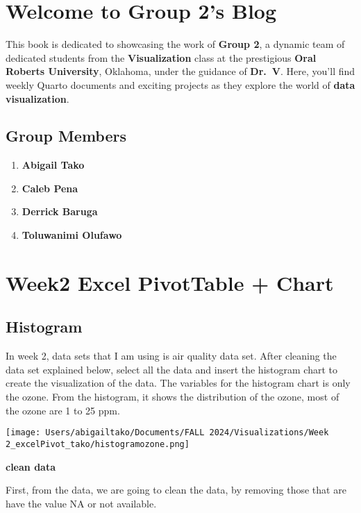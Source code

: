 \documentclass[
  letterpaper,
  DIV=11,
  numbers=noendperiod]{scrreprt}
\providecommand{\tightlist}{%
  \setlength{\itemsep}{0pt}\setlength{\parskip}{0pt}}\usepackage{longtable,booktabs,array}
\begin{document}
\chapter{Welcome to Group 2's Blog}\label{welcome-to-group-2s-blog}

This book is dedicated to showcasing the work of \textbf{Group 2}, a
dynamic team of dedicated students from the \textbf{Visualization} class
at the prestigious \textbf{Oral Roberts University}, Oklahoma, under the
guidance of \textbf{Dr.~V}. Here, you'll find weekly Quarto documents
and exciting projects as they explore the world of \textbf{data
visualization}.

\section{Group Members}\label{group-members}

\begin{enumerate}
\def\labelenumi{\arabic{enumi}.}
\tightlist
\item
  \textbf{Abigail Tako}
\item
  \textbf{Caleb Pena}
\item
  \textbf{Derrick Baruga}
\item
  \textbf{Toluwanimi Olufawo}
\end{enumerate}


\chapter{Week2 Excel PivotTable +
Chart}\label{week2-excel-pivottable-chart}

\section{Histogram}\label{histogram}

In week 2, data sets that I am using is air quality data set. After
cleaning the data set explained below, select all the data and insert
the histogram chart to create the visualization of the data. The
variables for the histogram chart is only the ozone. From the histogram,
it shows the distribution of the ozone, most of the ozone are 1 to 25
ppm.

\texttt{[image: Users/abigailtako/Documents/FALL 2024/Visualizations/Week 2\_excelPivot\_tako/histogramozone.png]}

\textbf{clean data}

First, from the data, we are going to clean the data, by removing those
that are have the value NA or not available.
\end{document}
